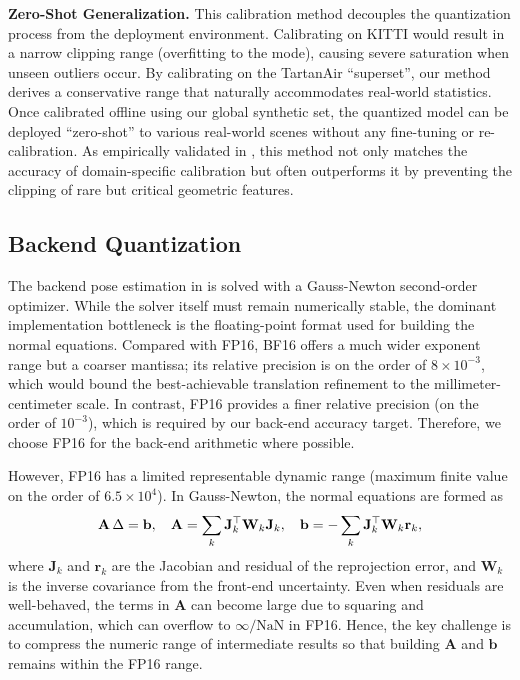 \textbf{Zero-Shot Generalization.}
This calibration method decouples the quantization process from the deployment environment. Calibrating on KITTI would result in a narrow clipping range (overfitting to the mode), causing severe saturation when unseen outliers occur. By calibrating on the TartanAir ``superset'', our method derives a conservative range that naturally accommodates real-world statistics. Once calibrated offline using our global synthetic set, the quantized model can be deployed ``zero-shot'' to various real-world scenes without any fine-tuning or re-calibration. As empirically validated in , this method not only matches the accuracy of domain-specific calibration but often outperforms it by preventing the clipping of rare but critical geometric features.


\subsection{Backend Quantization}
\label{sec:backend_quant}

The backend pose estimation in  is solved with a Gauss-Newton second-order optimizer. While the solver itself must remain numerically stable, the dominant implementation bottleneck is the floating-point format used for building the normal equations. Compared with FP16, BF16 offers a much wider exponent range but a coarser mantissa; its relative precision is on the order of $8\times10^{-3}$, which would bound the best-achievable translation refinement to the millimeter-centimeter scale. In contrast, FP16 provides a finer relative precision (on the order of $10^{-3}$), which is required by our back-end accuracy target. Therefore, we choose FP16 for the back-end arithmetic where possible.

However, FP16 has a limited representable dynamic range (maximum finite value on the order of $6.5\times 10^4$). In Gauss-Newton, the normal equations are formed as
\begin{equation}
\small
\label{eq:normal_equation_backend}
\mathbf{A}\,\Delta = \mathbf{b},
\quad
\mathbf{A} = \sum_k \mathbf{J}_k^\top \mathbf{W}_k \mathbf{J}_k,
\quad
\mathbf{b} = -\sum_k \mathbf{J}_k^\top \mathbf{W}_k \mathbf{r}_k,
\end{equation}
where $\mathbf{J}_k$ and $\mathbf{r}_k$ are the Jacobian and residual of the reprojection error, and $\mathbf{W}_k$ is the inverse covariance from the front-end uncertainty. Even when residuals are well-behaved, the terms in $\mathbf{A}$ can become large due to squaring and accumulation, which can overflow to $\infty/\mathrm{NaN}$ in FP16. Hence, the key challenge is to compress the numeric range of intermediate results so that building $\mathbf{A}$ and $\mathbf{b}$ remains within the FP16 range.

